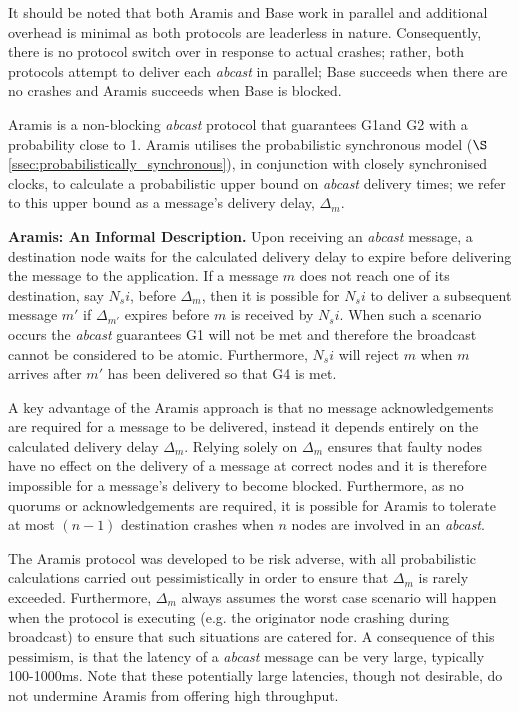     It should be noted that both \textsf{Aramis} and \textsf{Base} work in parallel and additional overhead is minimal as both protocols are leaderless in nature.  Consequently, there is no protocol switch over in response to actual crashes; rather, both protocols attempt to deliver each \emph{abcast} in parallel; \textsf{Base} succeeds when there are no crashes and \textsf{Aramis} succeeds when \textsf{Base} is blocked.  
    
    \textsf{Aramis} is a non-blocking \emph{abcast} protocol that guarantees G1and G2 with a probability close to 1.  \textsf{Aramis} utilises the probabilistic synchronous model ($\S$ \ref{ssec:probabilistically_synchronous}), in conjunction with closely synchronised clocks, to calculate a probabilistic upper bound on \emph{abcast} delivery times; we refer to this upper bound as a message's delivery delay, $\Delta_m$.  
    
    \textbf{\textsf{Aramis: } An Informal Description.}  Upon receiving an \emph{abcast} message, a destination node waits for the calculated delivery delay to expire before delivering the message to the application.  If a message $m$ does not reach one of its destination, say $N_si$, before $\Delta_m$, then it is possible for $N_si$ to deliver a subsequent message $m'$ if $\Delta_{m'}$ expires before $m$ is received by $N_si$.  When such a scenario occurs the \emph{abcast} guarantees G1 will not be met and therefore the broadcast cannot be considered to be atomic.  Furthermore, $N_si$ will reject $m$ when $m$ arrives after $m'$ has been delivered so that G4 is met.  
    
    A key advantage of the \textsf{Aramis} approach is that no message acknowledgements are required for a message to be delivered, instead it depends entirely on the calculated delivery delay $\Delta_m$.  Relying solely on $\Delta_m$ ensures that faulty nodes have no effect on the delivery of a message at correct nodes and it is therefore impossible for a message's delivery to become blocked.  Furthermore, as no quorums or acknowledgements are required, it is possible for  \textsf{Aramis} to tolerate at most $(n - 1)$ destination crashes when $n$ nodes are involved in an \emph{abcast}.  
    
    The \textsf{Aramis} protocol was developed to be risk adverse, with all probabilistic calculations carried out pessimistically in order to ensure that $\Delta_m$ is rarely exceeded.  Furthermore, $\Delta_m$ always assumes the worst case scenario will happen when the protocol is executing (e.g. the originator node crashing during broadcast) to ensure that such situations are catered for.  A consequence of this pessimism, is that the latency of a \emph{abcast} message can be very large, typically 100-1000ms.  Note that these potentially large latencies, though not desirable, do not undermine \textsf{Aramis} from offering high throughput.  
    
